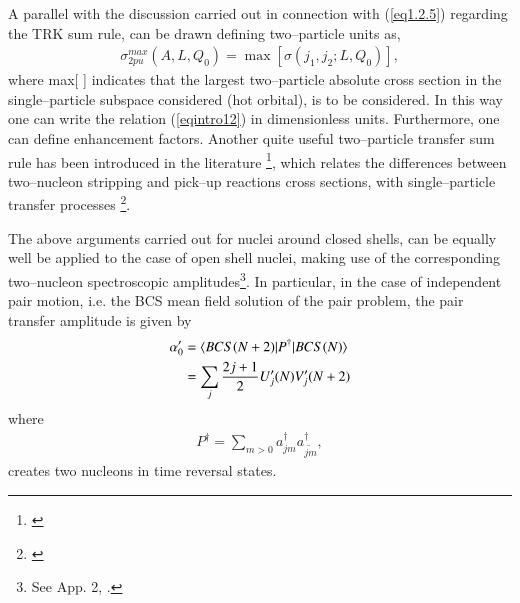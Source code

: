 A  parallel with the discussion carried out in connection with (\ref{eq1.2.5}) regarding the TRK sum rule, can be drawn defining two--particle units as,
\begin{align}
\sigma^{max}_{2pu}(A,L,Q_0)=\max \left[\sigma(j_1,j_2;L,Q_0)\right],
\end{align}
where max[ ] indicates that the largest two--particle absolute cross section in the single--particle subspace considered (hot orbital), is to be considered. In this way one can write the relation (\ref{eqintro12}) in dimensionless units. Furthermore, one can define enhancement factors. Another quite useful two--particle transfer sum rule has been introduced in the literature \footnote{\cite{Bayman:72}}, which relates the differences between two--nucleon stripping and pick--up reactions cross sections, with single--particle transfer processes \footnote{\cite{Lanford:77}}.


The above arguments carried out for nuclei around closed shells, can be equally well be applied to the case of open shell nuclei, making use of the corresponding two--nucleon spectroscopic amplitudes\footnote{See App. 2, \cite{Broglia:73}.}.
In particular, in the case of independent pair motion, i.e. the BCS mean field solution of the pair problem, the pair transfer amplitude is given by
\begin{align}\label{eq1.2.14}
\nonumber \alpha_0'&=\langle {BCS(N+2)|P^\dagger|BCS(N)} \rangle\\
&=\sum_{j}\frac{2j+1}{2}U'_j(N)V'_j(N+2)
\end{align}
where
\begin{align}\label{eq1.2.15}
P^\dagger=\sum_{m>0}a^\dagger_{jm}a^\dagger_{\widetilde{jm}},
\end{align}
creates two nucleons in time reversal states.

